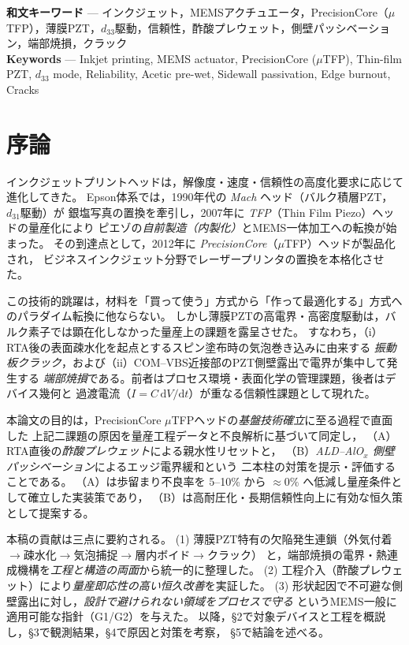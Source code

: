 \documentclass[conference]{IEEEtran}
\begin{document}
\begin{IEEEkeywords}
\textbf{和文キーワード} — インクジェット，MEMSアクチュエータ，PrecisionCore（$\mu$TFP），薄膜PZT，$d_{33}$駆動，信頼性，酢酸プレウェット，側壁パッシベーション，端部焼損，クラック \\
\textbf{Keywords} — Inkjet printing, MEMS actuator, PrecisionCore ($\mu$TFP), Thin-film PZT, $d_{33}$ mode, Reliability, Acetic pre-wet, Sidewall passivation, Edge burnout, Cracks
\end{IEEEkeywords}


\section{序論}
インクジェットプリントヘッドは，解像度・速度・信頼性の高度化要求に応じて進化してきた。
Epson体系では，1990年代の \emph{Mach} ヘッド（バルク積層PZT，$d_{31}$駆動）が
銀塩写真の置換を牽引し，2007年に \emph{TFP}（Thin Film Piezo）ヘッドの量産化により
ピエゾの\emph{自前製造（内製化）}とMEMS一体加工への転換が始まった。
その到達点として，2012年に \emph{PrecisionCore}（$\mu$TFP）ヘッドが製品化され，
ビジネスインクジェット分野でレーザープリンタの置換を本格化させた。

この技術的跳躍は，材料を「買って使う」方式から「作って最適化する」方式へのパラダイム転換に他ならない。
しかし薄膜PZTの高電界・高密度駆動は，バルク素子では顕在化しなかった量産上の課題を露呈させた。
すなわち，（i）RTA後の表面疎水化を起点とするスピン塗布時の気泡巻き込みに由来する
\emph{振動板クラック}，および（ii）COM–VBS近接部のPZT側壁露出で電界が集中して発生する
\emph{端部焼損}である。前者はプロセス環境・表面化学の管理課題，後者はデバイス幾何と
過渡電流（$I=C\,\mathrm{d}V/\mathrm{d}t$）が重なる信頼性課題として現れた。

本論文の目的は，PrecisionCore $\mu$TFPヘッドの\emph{基盤技術確立}に至る過程で直面した
上記二課題の原因を量産工程データと不良解析に基づいて同定し，
（A）RTA直後の\emph{酢酸プレウェット}による親水性リセットと，
（B）\emph{ALD–AlO$_x$ 側壁パッシベーション}によるエッジ電界緩和という
二本柱の対策を提示・評価することである。
（A）は歩留まり不良率を 5–10\% から \(\approx 0\%\) へ低減し量産条件として確立した実装策であり，
（B）は高耐圧化・長期信頼性向上に有効な恒久策として提案する。

本稿の貢献は三点に要約される。
(1) 薄膜PZT特有の欠陥発生連鎖（外気付着$\rightarrow$疎水化$\rightarrow$気泡捕捉$\rightarrow$層内ボイド$\rightarrow$クラック）
と，端部焼損の電界・熱連成機構を\emph{工程と構造の両面}から統一的に整理した。
(2) 工程介入（酢酸プレウェット）により\emph{量産即応性の高い恒久改善}を実証した。
(3) 形状起因で不可避な側壁露出に対し，\emph{設計で避けられない領域をプロセスで守る}
というMEMS一般に適用可能な指針（G1/G2）を与えた。
以降，\S2で対象デバイスと工程を概説し，\S3で観測結果，\S4で原因と対策を考察，
\S5で結論を述べる。
\end{document}
